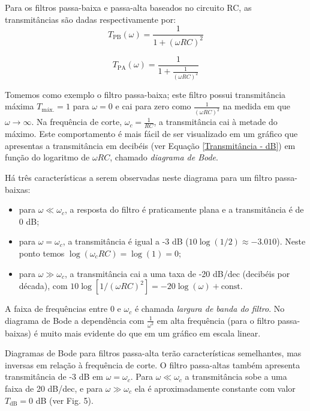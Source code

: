 \documentclass[letterpaper, 12pt]{article}
\begin{document}
Para os filtros passa-baixa e passa-alta baseados no circuito RC, as transmitâncias são dadas respectivamente por:
\begin{equation}\label{T_PB}
    T_{\text{PB}}(\omega)=\frac{1}{1+(\omega RC)^{2}}
\end{equation}

\begin{equation}\label{T_PA}
    T_{\text{PA}}(\omega)=\frac{1}{1+\frac{1}{(\omega RC)^{2}}}
\end{equation}

Tomemos como exemplo o filtro passa-baixa; este filtro possui transmitância máxima $T_{\text{máx.}}=1$ para $\omega=0$ e cai para zero como $\frac{1}{(\omega RC)^{2}}$ na medida em que $\omega\rightarrow\infty$. Na frequência de corte, $\omega_{c}=\frac{1}{RC}$, a transmitância cai à metade do máximo. Este comportamento é mais fácil de ser visualizado em um gráfico que apresentas a transmitância em decibéis (ver Equação \ref{Transmitância - dB}) em função do logaritmo de $\omega RC$, chamado \textit{diagrama de Bode}. 

Há três características a serem observadas neste diagrama para um filtro passa-baixas:
\begin{itemize}
    \item para $\omega\ll\omega_{c}$, a resposta do filtro é praticamente plana e a transmitância é de 0 dB;
    
    \item para $\omega=\omega_{c}$, a transmitância é igual a -3 dB ($10\log{(1/2)}\approx-3.010$). Neste ponto temos $\log{(\omega_{c}RC)}=\log{(1)}=0$;
    
    \item para $\omega\gg\omega_{c}$, a transmitância cai a uma taxa de -20 dB/dec (decibéis por década), com $10\log{[1/(\omega RC)^{2}]}=-20\log{(\omega)}+\text{const.}$
\end{itemize}

A faixa de frequências entre 0 e $\omega_{c}$ é chamada \textit{largura de banda do filtro}. No diagrama de Bode a dependência com $\frac{1}{\omega^{2}}$ em alta frequência (para o filtro passa-baixas) é muito mais evidente do que em um gráfico em escala linear.

Diagramas de Bode para filtros passa-alta terão características semelhantes, mas inversas em relação à frequência de corte. O filtro passa-altas também apresenta transmitância de -3 dB em $\omega=\omega_{c}$. Para $\omega\ll\omega_{c}$ a transmitância sobe a uma faixa de 20 dB/dec, e para $\omega\gg\omega_{c}$ ela é aproximadamente constante com valor $T_{\text{dB}}=0$ dB (ver Fig. 5).
\end{document}
